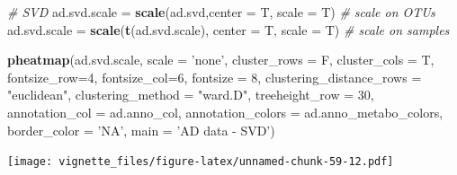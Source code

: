 \documentclass[]{book}
\newenvironment{Shaded}{\begin{snugshade}}{\end{snugshade}}
\newcommand{\KeywordTok}[1]{\textcolor[rgb]{0.13,0.29,0.53}{\textbf{#1}}}
\newcommand{\DataTypeTok}[1]{\textcolor[rgb]{0.13,0.29,0.53}{#1}}
\newcommand{\DecValTok}[1]{\textcolor[rgb]{0.00,0.00,0.81}{#1}}
\newcommand{\StringTok}[1]{\textcolor[rgb]{0.31,0.60,0.02}{#1}}
\newcommand{\CommentTok}[1]{\textcolor[rgb]{0.56,0.35,0.01}{\textit{#1}}}
\newcommand{\NormalTok}[1]{#1}
\begin{document}
\begin{Shaded}
\begin{Highlighting}[]
\CommentTok{# SVD}
\NormalTok{ad.svd.scale =}\StringTok{ }\KeywordTok{scale}\NormalTok{(ad.svd,}\DataTypeTok{center =}\NormalTok{ T, }\DataTypeTok{scale =}\NormalTok{ T) }\CommentTok{# scale on OTUs}
\NormalTok{ad.svd.scale =}\StringTok{ }\KeywordTok{scale}\NormalTok{(}\KeywordTok{t}\NormalTok{(ad.svd.scale), }\DataTypeTok{center =}\NormalTok{ T, }\DataTypeTok{scale =}\NormalTok{ T) }\CommentTok{# scale on samples}

\KeywordTok{pheatmap}\NormalTok{(ad.svd.scale, }
         \DataTypeTok{scale =} \StringTok{'none'}\NormalTok{, }
         \DataTypeTok{cluster_rows =}\NormalTok{ F, }
         \DataTypeTok{cluster_cols =}\NormalTok{ T, }
         \DataTypeTok{fontsize_row=}\DecValTok{4}\NormalTok{, }\DataTypeTok{fontsize_col=}\DecValTok{6}\NormalTok{,}
         \DataTypeTok{fontsize =} \DecValTok{8}\NormalTok{,}
         \DataTypeTok{clustering_distance_rows =} \StringTok{"euclidean"}\NormalTok{,}
         \DataTypeTok{clustering_method =} \StringTok{"ward.D"}\NormalTok{,}
         \DataTypeTok{treeheight_row =} \DecValTok{30}\NormalTok{,}
         \DataTypeTok{annotation_col =}\NormalTok{ ad.anno_col,}
         \DataTypeTok{annotation_colors =}\NormalTok{ ad.anno_metabo_colors,}
         \DataTypeTok{border_color =} \StringTok{'NA'}\NormalTok{,}
         \DataTypeTok{main =} \StringTok{'AD data - SVD'}\NormalTok{)}
\end{Highlighting}
\end{Shaded}

\texttt{[image: vignette\_files/figure-latex/unnamed-chunk-59-12.pdf]}
\end{document}
